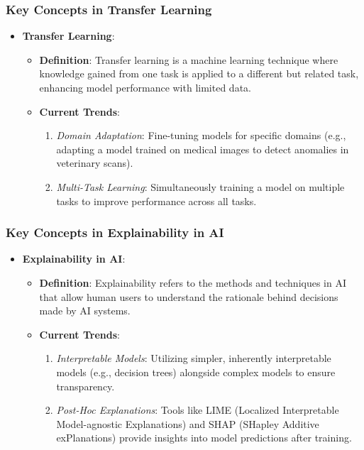 \documentclass[aspectratio=169]{beamer}
\begin{document}
\begin{frame}[fragile]
    \frametitle{Key Concepts in Transfer Learning}
    \begin{itemize}
        \item \textbf{Transfer Learning}:
        \begin{itemize}
            \item \textbf{Definition}: Transfer learning is a machine learning technique where knowledge gained from one task is applied to a different but related task, enhancing model performance with limited data.
            \item \textbf{Current Trends}:
            \begin{enumerate}
                \item \textit{Domain Adaptation}: Fine-tuning models for specific domains (e.g., adapting a model trained on medical images to detect anomalies in veterinary scans).
                \item \textit{Multi-Task Learning}: Simultaneously training a model on multiple tasks to improve performance across all tasks.
            \end{enumerate}
        \end{itemize}
    \end{itemize}
\end{frame}

\begin{frame}[fragile]
    \frametitle{Key Concepts in Explainability in AI}
    \begin{itemize}
        \item \textbf{Explainability in AI}:
        \begin{itemize}
            \item \textbf{Definition}: Explainability refers to the methods and techniques in AI that allow human users to understand the rationale behind decisions made by AI systems.
            \item \textbf{Current Trends}:
            \begin{enumerate}
                \item \textit{Interpretable Models}: Utilizing simpler, inherently interpretable models (e.g., decision trees) alongside complex models to ensure transparency.
                \item \textit{Post-Hoc Explanations}: Tools like LIME (Localized Interpretable Model-agnostic Explanations) and SHAP (SHapley Additive exPlanations) provide insights into model predictions after training.
            \end{enumerate}
        \end{itemize}
    \end{itemize}
\end{frame}
\end{document}
